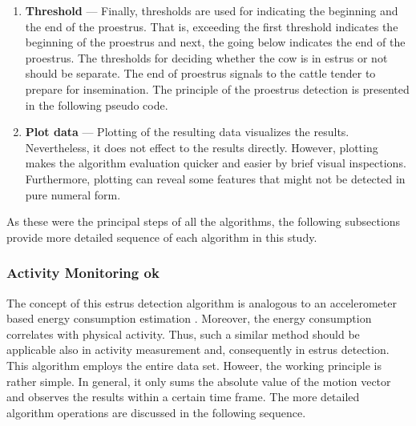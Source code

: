 \documentclass[english,12pt,a4paper,pdftex,elec,utf8]{aaltothesis}
\newcommand{\Clanguage}{\lstset{
  language=C++,                %
  basicstyle=\ttfamily,
  title=\lstname,                 %
}}
\begin{document}
\begin{enumerate}
\item \textbf{Threshold} --- Finally, thresholds are used for indicating the beginning and the end of the proestrus. That is, exceeding the first threshold indicates the beginning of the proestrus and next, the going below indicates the end of the proestrus. The thresholds for deciding whether the cow is in estrus or not should be separate. The end of proestrus signals to the cattle tender to prepare for insemination. The principle of the proestrus detection is presented in the following pseudo code.  


\item \textbf{Plot data} --- Plotting of the resulting data visualizes the results. Nevertheless, it does not effect to the results directly. However, plotting makes the algorithm evaluation quicker and easier by brief visual inspections. Furthermore, plotting can reveal some features that might not be detected in pure numeral form.

\end{enumerate}
As these were the principal steps of all the algorithms, the following subsections provide more detailed sequence of each algorithm in this study.


\subsubsection{Activity Monitoring ok} \label{activitymeasurementsection}

The concept of this estrus detection algorithm is analogous to an accelerometer based energy consumption estimation \cite{Kang2012}. Moreover, the energy consumption correlates with physical activity. Thus, such a similar method should be applicable also in activity measurement and, consequently in estrus detection. This algorithm employs the entire data set. Howeer, the working principle is rather simple. In general, it only sums the absolute value of the motion vector and observes the results within a certain time frame. The more detailed algorithm operations are discussed in the following sequence.
\end{document}
